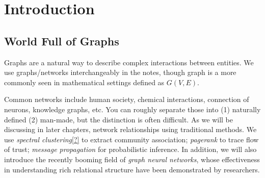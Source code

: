 \section{Introduction}

\subsection{World Full of Graphs}\label{ss_11}

Graphs are a natural way to describe complex interactions between entities. We use graphs/networks interchangeably in the notes, though graph is a more commonly seen in mathematical settings defined as $G(V, E)$.

Common networks include human society, chemical interactions, connection of neurons, knowledge graphs, etc. You can roughly separate those into (1) naturally defined (2) man-made, but the distinction is often difficult. As we will be discussing in later chapters, network relationships using traditional methods. We use \textit{spectral clustering}\ref{?} to extract community association; \textit{pagerank} to trace flow of trust; \textit{message propagation} for probabilistic inference. In addition, we will also introduce the recently booming field of \textit{graph neural networks}, whose effectiveness in understanding rich relational structure have been demonstrated by researchers.

